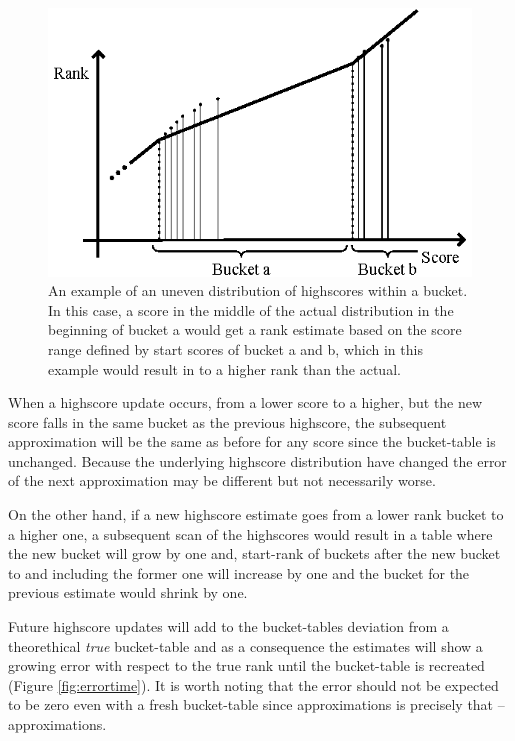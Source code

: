 \begin{figure}[h!]
  \centering
  \caption{An example of an uneven distribution of highscores within a bucket.
    In this case, a score in the middle of the actual distribution in the beginning of bucket a would get a rank estimate based on the score range defined by start scores of bucket a and b, which in this example would result in to a higher rank than the actual.}
  \label{fig:uneven}
  \includegraphics[width=13cm]{img/uneven_distribution.eps}
\end{figure}

When a highscore update occurs, from a lower score to a higher, but the new score falls in the same bucket as the previous highscore, the subsequent approximation will be the same as before for any score since the bucket-table is unchanged. Because the underlying highscore distribution have changed the error of the next approximation  may be different but not necessarily worse.

On the other hand, if a new highscore estimate goes from a lower rank bucket to a higher one, a subsequent scan of the highscores would result in a table where the new bucket will grow by one and, start-rank of buckets after the new bucket to and including the former one will increase by one and the bucket for the previous estimate would shrink by one.



Future highscore updates will add to the bucket-tables deviation from a theorethical \emph{true} bucket-table and as a consequence the estimates will show a growing error with respect to the true rank until the bucket-table is recreated (Figure \ref{fig:errortime}). It is worth noting that the error should not be expected to be zero even with a fresh bucket-table since approximations is precisely that -- approximations.

